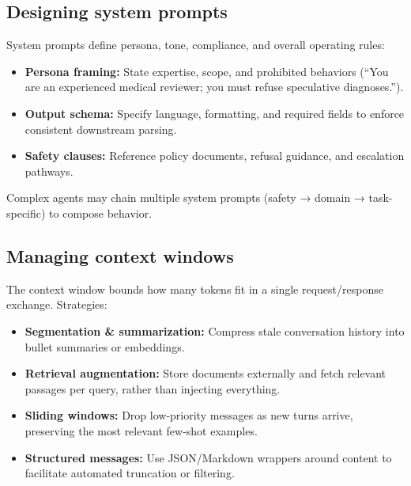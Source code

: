 \documentclass{article}
\begin{document}
\subsection{Designing system prompts}
System prompts define persona, tone, compliance, and overall operating rules:
\begin{itemize}
  \item \textbf{Persona framing:} State expertise, scope, and prohibited behaviors (“You are an experienced medical reviewer; you must refuse speculative diagnoses.”).
  \item \textbf{Output schema:} Specify language, formatting, and required fields to enforce consistent downstream parsing.
  \item \textbf{Safety clauses:} Reference policy documents, refusal guidance, and escalation pathways.
\end{itemize}
Complex agents may chain multiple system prompts (safety → domain → task-specific) to compose behavior.

\subsection{Managing context windows}
The context window bounds how many tokens fit in a single request/response exchange. Strategies:
\begin{itemize}
  \item \textbf{Segmentation \& summarization:} Compress stale conversation history into bullet summaries or embeddings.
  \item \textbf{Retrieval augmentation:} Store documents externally and fetch relevant passages per query, rather than injecting everything.
  \item \textbf{Sliding windows:} Drop low-priority messages as new turns arrive, preserving the most relevant few-shot examples.
  \item \textbf{Structured messages:} Use JSON/Markdown wrappers around content to facilitate automated truncation or filtering.
\end{itemize}
\end{document}
